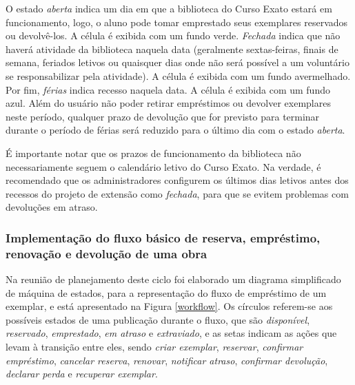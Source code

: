 \documentclass[a4paper]{article}
\begin{document}
O estado \textit{aberta} indica um dia em que a biblioteca do Curso Exato estará em funcionamento, logo, o aluno pode tomar emprestado seus exemplares reservados ou devolvê-los. A célula é exibida com um fundo verde. \textit{Fechada} indica que não haverá atividade da biblioteca naquela data (geralmente sextas-feiras, finais de semana, feriados letivos ou quaisquer dias onde não será possível a um voluntário se responsabilizar pela atividade). A célula é exibida com um fundo avermelhado. Por fim, \textit{férias} indica recesso naquela data. A célula é exibida com um fundo azul. Além do usuário não poder retirar empréstimos ou devolver exemplares neste período, qualquer prazo de devolução que for previsto para terminar durante o período de férias será reduzido para o último dia com o estado \textit{aberta}.

É importante notar que os prazos de funcionamento da biblioteca não necessariamente seguem o calendário letivo do Curso Exato. Na verdade, é recomendado que os administradores configurem os últimos dias letivos antes dos recessos do projeto de extensão como \textit{fechada}, para que se evitem problemas com devoluções em atraso.

\subsubsection{Implementação do fluxo básico de reserva, empréstimo, renovação e devolução de uma obra} \label{sssec:stransaction}
Na reunião de planejamento deste ciclo foi elaborado um diagrama simplificado de máquina de estados, para a representação do fluxo de empréstimo de um exemplar, e está apresentado na Figura \ref{workflow}. Os círculos referem-se aos possíveis estados de uma publicação durante o fluxo, que são \textit{disponível}, \textit{reservado}, \textit{emprestado}, \textit{em atraso} e \textit{extraviado}, e as setas indicam as ações que levam à transição entre eles, sendo \textit{criar exemplar}, \textit{reservar}, \textit{confirmar empréstimo}, \textit{cancelar reserva}, \textit{renovar}, \textit{notificar atraso}, \textit{confirmar devolução}, \textit{declarar perda} e \textit{recuperar exemplar}.
\end{document}
